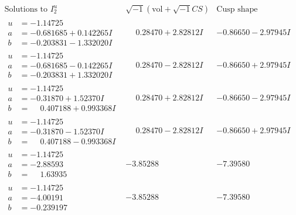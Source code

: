 \documentclass[1p]{elsarticle_modified}
\theoremstyle{definition}
\newcommand{\I}{\sqrt{-1}}
\begin{document}
$$\begin{array}{c|c|c}  
\text{Solutions to }I^u_{2}& \I (\text{vol} + \sqrt{-1}CS) & \text{Cusp shape}\\
 \hline 
\begin{aligned}
u &= -1.14725\phantom{ +0.000000I} \\
a &= -0.681685 + 0.142265 I \\
b &= -0.203831 - 1.332020 I\end{aligned}
 & \phantom{-}0.28470 + 2.82812 I & -0.86650 - 2.97945 I \\ \hline\begin{aligned}
u &= -1.14725\phantom{ +0.000000I} \\
a &= -0.681685 - 0.142265 I \\
b &= -0.203831 + 1.332020 I\end{aligned}
 & \phantom{-}0.28470 - 2.82812 I & -0.86650 + 2.97945 I \\ \hline\begin{aligned}
u &= -1.14725\phantom{ +0.000000I} \\
a &= -0.31870 + 1.52370 I \\
b &= \phantom{-}0.407188 + 0.993368 I\end{aligned}
 & \phantom{-}0.28470 + 2.82812 I & -0.86650 - 2.97945 I \\ \hline\begin{aligned}
u &= -1.14725\phantom{ +0.000000I} \\
a &= -0.31870 - 1.52370 I \\
b &= \phantom{-}0.407188 - 0.993368 I\end{aligned}
 & \phantom{-}0.28470 - 2.82812 I & -0.86650 + 2.97945 I \\ \hline\begin{aligned}
u &= -1.14725\phantom{ +0.000000I} \\
a &= -2.88593\phantom{ +0.000000I} \\
b &= \phantom{-}1.63935\phantom{ +0.000000I}\end{aligned}
 & -3.85288\phantom{ +0.000000I} & -7.39580\phantom{ +0.000000I} \\ \hline\begin{aligned}
u &= -1.14725\phantom{ +0.000000I} \\
a &= -4.00191\phantom{ +0.000000I} \\
b &= -0.239197\phantom{ +0.000000I}\end{aligned}
 & -3.85288\phantom{ +0.000000I} & -7.39580\phantom{ +0.000000I} \\ \hline\begin{aligned}

\end{aligned}
\end{array}$$
\end{document}
